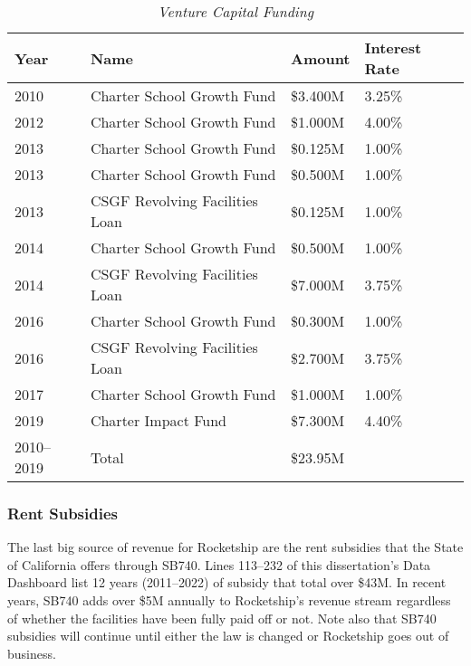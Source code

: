\begin{table}[ht]
  \SingleSpacing
  \caption[Venture Capital Funding]{\textit{Venture Capital Funding}}%
  \label{tab:venture_captial_funding}
  \begin{tabular}{llll}
    \toprule
    \textbf{Year} & \textbf{Name}         & \textbf{Amount} & \textbf{Interest Rate} \\
    \midrule
    2010 & Charter School Growth Fund     & \$3.400M & 3.25\%        \\
    2012 & Charter School Growth Fund     & \$1.000M & 4.00\%        \\
    2013 & Charter School Growth Fund     & \$0.125M & 1.00\%        \\
    2013 & Charter School Growth Fund     & \$0.500M & 1.00\%        \\
    2013 & CSGF Revolving Facilities Loan & \$0.125M & 1.00\%        \\
    2014 & Charter School Growth Fund     & \$0.500M & 1.00\%        \\
    2014 & CSGF Revolving Facilities Loan & \$7.000M & 3.75\%        \\
    2016 & Charter School Growth Fund     & \$0.300M & 1.00\%        \\
    2016 & CSGF Revolving Facilities Loan & \$2.700M & 3.75\%        \\
    2017 & Charter School Growth Fund     & \$1.000M & 1.00\%        \\
    2019 & Charter Impact Fund            & \$7.300M & 4.40\%        \\
    \midrule
    2010–2019 & Total                     & \$23.95M &               \\
    \bottomrule
  \end{tabular}
\end{table}

\subsubsection{Rent Subsidies}%
\label{sec:rent-subsidies}\indent%

The last big source of revenue for Rocketship are the rent subsidies that the State of California offers through SB740. Lines 113–232 of this dissertation's Data Dashboard list 12 years (2011–2022) of subsidy that total over \$43M. In recent years, SB740 adds over \$5M annually to Rocketship's revenue stream regardless of whether the facilities have been fully paid off or not. Note also that SB740 subsidies will continue until either the law is changed or Rocketship goes out of business.

